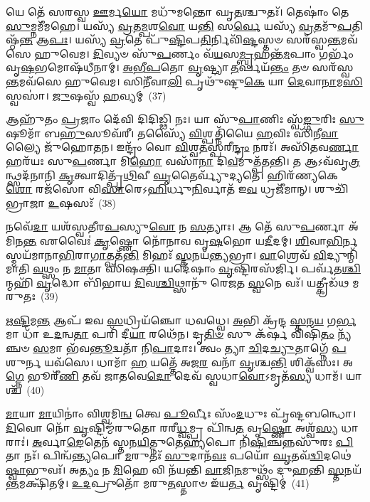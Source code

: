 𑌯𑍇 𑌤𑍇᳴ 𑌸𑌰𑌸𑍍𑌵 \ul{𑌊}\-𑌰𑍍𑌮\-\ul{𑌯𑍋} 𑌮𑌧𑍁᳴𑌮𑌨𑍍𑌤𑍋 𑌘𑍃\-\ul{𑌤}\-𑌶𑍍𑌚𑍁𑌤𑌃᳴। 𑌤𑍇𑌷𑌾𑌂॑ 𑌤𑍇 \ul{𑌸𑍁}\-𑌮𑍍𑌨𑌮𑍀᳴𑌮𑌹𑍇। 𑌯𑌸𑍍𑌯᳴ \ul{𑌵𑍍𑌰}\-𑌤\-\ul{𑌮𑍍𑌪}\-𑌶\-\ul{𑌵𑍋} 𑌯\-\ul{𑌨𑍍𑌤𑌿} 𑌸\-\ul{𑌰𑍍𑌵𑍇} 𑌯𑌸𑍍𑌯᳴ \ul{𑌵𑍍𑌰}\-𑌤𑌮𑍁᳴\-\ul{𑌪}\-𑌤𑌿𑌷𑍍𑌠᳴\-\ul{𑌨𑍍𑌤} 𑌆\-\ul{𑌪𑌃}\-। 𑌯𑌸𑍍𑌯᳴ \ul{𑌵𑍍𑌰}\-𑌤𑍇 𑌪𑍁᳴\-\ul{𑌷𑍍𑌟𑌿}\-𑌪\-\ul{𑌤𑌿}\-𑌰𑍍𑌨𑌿𑌵𑌿᳴\-\ul{𑌷𑍍𑌟}\-𑌸𑍍𑌤𑍞 𑌸𑌰᳴𑌸𑍍𑌵\-\ul{𑌨𑍍𑌤}\-𑌮𑌵᳴𑌸𑍇 𑌹𑍁𑌵𑍇𑌮। \ul{𑌦𑌿}\-𑌵𑍍𑌯𑍞 𑌸𑍁᳴\-\ul{𑌪}\-𑌰𑍍𑌣𑌂 𑌵᳴\-\ul{𑌯}\-𑌸\-\ul{𑌮𑍍𑌬𑍃}\-𑌹𑌨𑍍𑌤᳴\-\ul{𑌮}\-𑌪𑌾𑌂 𑌗𑌰𑍍𑌭𑌂᳴ 𑌵𑍃\-\ul{𑌷}\-𑌭𑌮𑍋𑌷᳴𑌧𑍀𑌨𑌾𑌮𑍍। \ul{𑌅}\-\-\ul{𑌭𑍀}\-\-\ul{𑌪}\-𑌤𑍋 \ul{𑌵𑍃}\-𑌷𑍍𑌟𑍍𑌯𑌾 \ul{𑌤}\-𑌰𑍍𑌪𑌯᳴\-\ul{𑌨𑍍𑌤𑌂} 𑌤𑍞 𑌸𑌰᳴𑌸𑍍𑌵\-\ul{𑌨𑍍𑌤}\-𑌮𑌵᳴𑌸𑍇 𑌹𑍁𑌵𑍇𑌮। 𑌸𑌿𑌨𑍀᳴𑌵𑌾\-\ul{𑌲𑌿} 𑌪𑍃𑌥𑍁᳴𑌷𑍍𑌟𑍁\-\ul{𑌕𑍇} 𑌯𑌾 \ul{𑌦𑍇}\-𑌵𑌾\-\ul{𑌨𑌾}\-𑌮\-\ul{𑌸𑌿} 𑌸𑍍𑌵𑌸𑌾॑। \ul{𑌜𑍁}\-𑌷𑌸𑍍𑌵᳴ \ul{𑌹}\-𑌵𑍍𑌯𑌮𑍍~(37)

𑌆𑌹𑍁᳴𑌤𑌂 \ul{𑌪𑍍𑌰}\-𑌜𑌾𑌂 𑌦𑍇᳴𑌵𑌿 𑌦𑌿𑌦𑌿𑌡𑍍𑌢𑌿 𑌨𑌃। 𑌯𑌾 𑌸𑍁᳴\-\ul{𑌪𑌾}\-𑌣𑌿𑌃 𑌸𑍍𑌵᳴\-\ul{𑌙𑍍𑌗𑍁}\-𑌰𑌿𑌃 \ul{𑌸𑍁}\-𑌷𑍂𑌮𑌾᳴ 𑌬\-\ul{𑌹𑍁}\-𑌸𑍂𑌵᳴𑌰𑍀। 𑌤𑌸𑍍𑌯𑍈᳴ \ul{𑌵𑌿}\-𑌶𑍍𑌪𑌤𑍍𑌨𑌿᳴𑌯𑍈 \ul{𑌹}\-𑌵𑌿𑌃 𑌸𑌿᳴𑌨𑍀\-\ul{𑌵𑌾}\-𑌲𑍍𑌯𑍈 𑌜𑍁᳴𑌹𑍋𑌤𑌨। 𑌇𑌨𑍍𑌦𑍍𑌰𑌂᳴ 𑌵𑍋 \ul{𑌵𑌿}\-𑌶𑍍𑌵\-\ul{𑌤}\-𑌸𑍍𑌪𑌰𑍀\-\ul{𑌨𑍍𑌦𑍍𑌰𑌂} 𑌨𑌰𑌃᳴। 𑌅𑌸𑌿᳴𑌤𑌵\-\ul{𑌰𑍍𑌣𑌾} 𑌹𑌰᳴𑌯𑌃 𑌸𑍁\-\ul{𑌪}\-𑌰𑍍𑌣𑌾 𑌮𑌿\-\ul{𑌹𑍋} 𑌵𑌸𑌾᳴\-\ul{𑌨𑌾} 𑌦𑌿\-\ul{𑌵}\-𑌮𑍁𑌤𑍍𑌪᳴𑌤𑌨𑍍𑌤𑌿। 𑌤 𑌆\-𑌽𑌵᳴𑌵𑍃\-\ul{𑌤𑍍𑌰}\-𑌨𑍍𑌥𑍍𑌸𑌦᳴𑌨𑌾𑌨𑌿 \ul{𑌕𑍃}\-𑌤𑍍𑌵𑌾𑌦𑌿𑌤𑍍𑌪𑍃᳴\-\ul{𑌥𑌿}\-𑌵𑍀 \ul{𑌘𑍃}\-𑌤𑍈𑌰𑍍𑌵𑍍𑌯𑍁᳴𑌦𑍍𑌯𑌤𑍇। 𑌹𑌿𑌰᳴𑌣𑍍𑌯𑌕𑍇\-\ul{𑌶𑍋} 𑌰𑌜᳴𑌸𑍋 𑌵𑌿\-\ul{𑌸𑌾}\-𑌰𑍇\-𑌽\-\ul{𑌹𑌿}\-𑌰𑍍𑌧𑍁\-\ul{𑌨𑌿}\-𑌰𑍍𑌵𑌾𑌤᳴ 𑌇\-\ul{𑌵} 𑌧𑍍𑌰𑌜𑍀᳴𑌮𑌾𑌨𑍍। 𑌶𑍁𑌚𑌿᳴𑌭𑍍𑌰𑌾𑌜𑌾 \ul{𑌉}\-𑌷𑌸𑌃᳴~(38)

𑌨𑌵𑍇᳴\-\ul{𑌦𑌾} 𑌯𑌶᳴𑌸𑍍𑌵𑌤𑍀𑌰\-\ul{𑌪}\-𑌸𑍍𑌯𑍁\-\ul{𑌵𑍋} 𑌨 \ul{𑌸}\-𑌤𑍍𑌯𑌾𑌃। 𑌆 𑌤𑍇᳴ 𑌸𑍁\-\ul{𑌪}\-𑌰𑍍𑌣𑌾 𑌅᳴𑌮𑌿𑌨\-\ul{𑌨𑍍𑌤} 𑌏𑌵𑍈𑌃॑ \ul{𑌕𑍃}\-𑌷𑍍𑌣𑍋 𑌨𑍋᳴𑌨𑌾𑌵 𑌵𑍃\-\ul{𑌷}\-𑌭𑍋 𑌯\-\ul{𑌦𑍀}\-𑌦𑌮𑍍। \ul{𑌶𑌿}\-𑌵𑌾\-\ul{𑌭𑌿}\-𑌰𑍍𑌨 𑌸𑍍𑌮𑌯᳴𑌮𑌾𑌨𑌾\-\ul{𑌭𑌿}\-𑌰𑌾\-\ul{𑌗𑌾}\-𑌤𑍍𑌪𑌤᳴\-\ul{𑌨𑍍𑌤𑌿} 𑌮𑌿𑌹𑌃᳴ \ul{𑌸𑍍𑌤}\-𑌨𑌯᳴\-\ul{𑌨𑍍𑌤𑍍𑌯}\-𑌭𑍍𑌰𑌾। \ul{𑌵𑌾}\-𑌶𑍍𑌰𑍇𑌵᳴ \ul{𑌵𑌿}\-𑌦𑍍𑌯𑍁𑌨𑍍𑌮𑌿᳴𑌮𑌾𑌤𑌿 \ul{𑌵}\-𑌥𑍍𑌸𑌂 𑌨 \ul{𑌮𑌾}\-𑌤𑌾 𑌸𑌿᳴𑌷𑌕𑍍𑌤𑌿। 𑌯𑌦𑍇᳴𑌷𑌾𑌂 \ul{𑌵𑍃}\-𑌷𑍍𑌟𑌿𑌰𑌸᳴𑌰𑍍𑌜𑌿। 𑌪𑌰𑍍𑌵᳴𑌤\-\ul{𑌶𑍍𑌚𑌿}\-𑌨𑍍𑌮𑌹𑌿᳴ \ul{𑌵𑍃}\-𑌦𑍍𑌧𑍋 𑌬𑌿᳴𑌭𑌾𑌯 \ul{𑌦𑌿}\-𑌵\-\ul{𑌶𑍍𑌚𑌿}\-𑌥𑍍𑌸𑌾𑌨𑍁᳴ 𑌰𑍇𑌜𑌤 \ul{𑌸𑍍𑌵}\-𑌨𑍇 𑌵𑌃᳴। 𑌯𑌤𑍍𑌕𑍍𑌰𑍀𑌡᳴𑌥 𑌮𑌰𑍁𑌤𑌃~(39)

\-\ul{𑌋}\-\-\ul{𑌷𑍍𑌟𑌿}\-𑌮\-\ul{𑌨𑍍𑌤} 𑌆𑌪᳴ 𑌇𑌵 \ul{𑌸}\-𑌧𑍍𑌰𑌿𑌯᳴𑌞𑍍𑌚𑍋 𑌧𑌵𑌧𑍍𑌵𑍇। \ul{𑌅}\-𑌭𑌿 𑌕𑍍𑌰᳴𑌨𑍍𑌦 \ul{𑌸𑍍𑌤}\-𑌨\-\ul{𑌯} 𑌗\-\ul{𑌰𑍍𑌭}\-𑌮𑌾 𑌧𑌾᳴ 𑌉\-\ul{𑌦}\-𑌨𑍍𑌵\-\ul{𑌤𑌾} 𑌪𑌰𑌿᳴ 𑌦𑍀\-\ul{𑌯𑌾} 𑌰𑌥𑍇᳴𑌨। 𑌦𑍃\-\ul{𑌤𑌿}\-\-\ul{𑍞} 𑌸𑍁 𑌕᳴𑌰𑍍\mbox{}\-\ul{𑌷} 𑌵𑌿𑌷𑌿᳴\-\ul{𑌤𑌂} 𑌨𑍍𑌯᳴𑌞𑍍𑌚𑍞 \ul{𑌸}\-𑌮𑌾 𑌭᳴𑌵\-\ul{𑌨𑍍𑌤𑍂}\-𑌦𑍍𑌵𑌤𑌾᳴ 𑌨𑌿\-\ul{𑌪𑌾}\-𑌦𑌾𑌃। 𑌤𑍍𑌵𑌂 𑌤𑍍𑌯𑌾 \ul{𑌚𑌿}\-𑌦\-\ul{𑌚𑍍𑌯𑍁}\-𑌤𑌾𑌗𑍍𑌨𑍇᳴ \ul{𑌪}\-𑌶𑍁𑌰𑍍𑌨 𑌯𑌵᳴𑌸𑍇। 𑌧𑌾𑌮𑌾᳴ \ul{𑌹} 𑌯𑌤𑍍𑌤𑍇᳴ 𑌅𑌜\-\ul{𑌰} 𑌵𑌨𑌾᳴ \ul{𑌵𑍃}\-𑌶𑍍𑌚\-\ul{𑌨𑍍𑌤𑌿} 𑌶𑌿𑌕𑍍𑌵᳴𑌸𑌃। 𑌅\-\ul{𑌗𑍍𑌨𑍇} 𑌭𑍂𑌰𑍀᳴\-\ul{𑌣𑌿} 𑌤𑌵᳴ 𑌜𑌾𑌤𑌵𑍇\-\ul{𑌦𑍋} 𑌦𑍇𑌵᳴ 𑌸𑍍𑌵𑌧𑌾\-\ul{𑌵𑍋}\-\-𑌽𑌮𑍃𑌤᳴\-\ul{𑌸𑍍𑌯} 𑌧𑌾𑌮᳴। 𑌯𑌾𑌶𑍍𑌚᳴~(40)

\-\ul{𑌮𑌾}\-𑌯𑌾 \ul{𑌮𑌾}\-𑌯𑌿𑌨𑌾𑌂॑ 𑌵𑌿𑌶𑍍𑌵𑌮𑌿\-\ul{𑌨𑍍𑌵} 𑌤𑍍𑌵𑍇 \ul{𑌪𑍂}\-𑌰𑍍𑌵𑍀𑌃 𑌸𑌂᳴\-\ul{𑌦}\-𑌧𑍁𑌃 𑌪𑍃᳴𑌷𑍍𑌟𑌬𑌨𑍍𑌧𑍋। \ul{𑌦𑌿}\-𑌵𑍋 𑌨𑍋᳴ \ul{𑌵𑍃}\-𑌷𑍍𑌟𑌿𑌮𑍍𑌮᳴𑌰𑍁𑌤𑍋 𑌰𑌰𑍀\-\ul{𑌧𑍍𑌵}\-𑌮𑍍𑌪𑍍𑌰 𑌪𑌿᳴𑌨𑍍𑌵\-\ul{𑌤} 𑌵𑍃\-\ul{𑌷𑍍𑌣𑍋} 𑌅𑌶𑍍𑌵᳴\-\ul{𑌸𑍍𑌯} 𑌧𑌾𑌰𑌾𑌃॑। \ul{𑌅}\-𑌰𑍍𑌵𑌾\-\ul{𑌙𑍇}\-𑌤𑍇𑌨᳴ 𑌸𑍍𑌤𑌨\-\ul{𑌯𑌿}\-𑌤𑍍𑌨𑍁𑌤𑍇\-\ul{𑌹𑍍𑌯}\-𑌪𑍋 𑌨𑌿᳴\-\ul{𑌷𑌿}\-𑌞𑍍𑌚𑌨𑍍𑌨𑌸𑍁᳴𑌰𑌃 \ul{𑌪𑌿}\-𑌤𑌾 𑌨𑌃᳴। 𑌪𑌿𑌨𑍍𑌵᳴\-\ul{𑌨𑍍𑌤𑍍𑌯}\-𑌪𑍋 \ul{𑌮}\-𑌰𑍁𑌤𑌃᳴ \ul{𑌸𑍁}\-𑌦𑌾𑌨᳴\-\ul{𑌵𑌃} 𑌪𑌯𑍋᳴ \ul{𑌘𑍃}\-𑌤𑌵᳴\-\ul{𑌦𑍍𑌵𑌿}\-𑌦𑌥𑍇॑\-\ul{𑌷𑍍𑌵𑌾}\-𑌭𑍁𑌵𑌃᳴। 𑌅\-\ul{𑌤𑍍𑌯𑌂} 𑌨 \ul{𑌮𑌿}\-𑌹𑍇 𑌵𑌿 𑌨᳴𑌯𑌨𑍍𑌤𑌿 \ul{𑌵𑌾}\-𑌜𑌿\-\ul{𑌨}\-𑌮𑍁𑌥𑍍𑌸𑌂᳴ 𑌦𑍁𑌹𑌨𑍍𑌤𑌿 \ul{𑌸𑍍𑌤}\-𑌨𑌯᳴\-\ul{𑌨𑍍𑌤}\-𑌮𑌕𑍍𑌷𑌿᳴𑌤𑌮𑍍। \ul{𑌉}\-\-\ul{𑌦}\-𑌪𑍍𑌰𑍁𑌤𑍋᳴ 𑌮𑌰𑍁\-\ul{𑌤}\-𑌸𑍍𑌤𑌾𑍞 𑌇᳴𑌯\-\ul{𑌰𑍍𑌤} 𑌵𑍃𑌷𑍍𑌟𑌿𑌮𑍍॑~(41)

